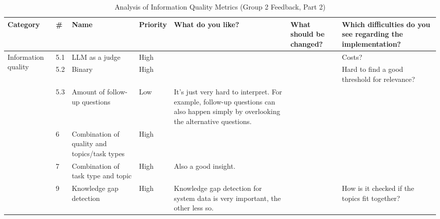 \documentclass[
	english,
	ruledheaders=section,%
	class=report,%
	thesis={type=bachelor},%
	accentcolor=1b,%
	custommargins=true,%
	marginpar=false,%
	parskip=half-,%
	fontsize=11pt,%
	DIV=14,
]{tudapub}
\begin{document}
\begin{table}
    \centering
    \small 
    \caption{Analysis of Information Quality Metrics (Group 2 Feedback, Part 2)}
    \label{tab:info_quality_g2_p2}
    \begin{tabularx}{\textheight}{p{2.2cm} l >{\RaggedRight\arraybackslash}X l >{\RaggedRight\arraybackslash}X >{\RaggedRight\arraybackslash}X >{\RaggedRight\arraybackslash}X}
        \toprule
        \textbf{Category} & \textbf{\#} & \textbf{Name} & \textbf{Priority} & \textbf{What do you like?} & \textbf{What should be changed?} & \textbf{Which difficulties do you see regarding the implementation?} \\
        \midrule

        \multirow{6}{=}{Information quality} 
        & 5.1 & LLM as a judge & High & & & Costs? \\
        \cmidrule(l){2-7}
        & 5.2 & Binary & High & & & Hard to find a good threshold for relevance? \\
        \cmidrule(l){2-7}
        & 5.3 & Amount of follow-up questions & Low & It's just very hard to interpret. For example, follow-up questions can also happen simply by overlooking the alternative questions. & & \\
        \cmidrule(l){2-7}
        & 6 & Combination of quality and topics/task types & High & & & \\
        \cmidrule(l){2-7}
        & 7 & Combination of task type and topic & High & Also a good insight. & & \\
        \cmidrule(l){2-7}
        & 9 & Knowledge gap detection & High & Knowledge gap detection for system data is very important, the other less so. & & How is it checked if the topics fit together? \\
        \bottomrule
    \end{tabularx}
\end{table}
\end{document}
